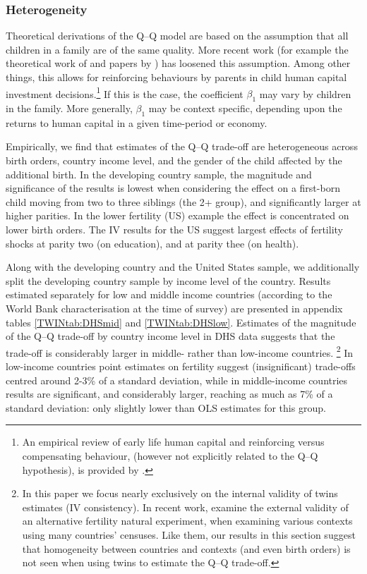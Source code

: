 \documentclass[subeqn]{article}
\begin{document}
\begin{spacing}{1.4}
\subsubsection{Heterogeneity}
Theoretical derivations of the Q--Q model are based on the assumption that all
children in a family are of the same quality. More recent work (for example the 
theoretical work of \citet{AizerCunha2012} and papers by \citet{Brinchetal2016,
  MogstadWiswall2016}) has loosened this assumption. Among 
other things, this allows for reinforcing behaviours by parents in child human 
capital investment decisions.\footnote{An empirical review of early life human 
capital and reinforcing versus compensating behaviour, (however not explicitly 
related to the Q--Q hypothesis), is provided by \citet{AlmondMazumder2013}.} If 
this is the case, the coefficient $\beta_1$ may vary by children in the family. 
More generally, $\beta_1$ may be context specific, depending upon the returns to 
human capital in a given time-period or economy.

Empirically, we find that estimates of the Q--Q trade-off are heterogeneous 
across birth orders, country income level, and the gender of the child affected 
by the additional birth. In the developing country sample, the magnitude and
significance of the results is lowest when considering the effect on a first-born
child moving from two to three siblings (the 2+ group), and significantly larger
at higher parities.  In the lower fertility (US) example the effect is
concentrated on lower birth orders. The IV results for the US suggest largest
effects of fertility shocks at parity two (on education), and at parity thee
(on health).

Along with the developing country and the United States sample, we additionally
split the developing country sample by income level of the country.  Results
estimated separately for low and middle income countries (according to the
World Bank characterisation at the time of survey) are presented in appendix
tables \ref{TWINtab:DHSmid} and \ref{TWINtab:DHSlow}. Estimates of the magnitude
of the Q--Q trade-off by country income level in DHS data suggests that the
trade-off is considerably larger in middle- rather than low-income countries.%
\footnote{In this paper we focus nearly exclusively on the internal validity
  of twins estimates (IV consistency).  In recent work, \citet{Deheijaetal2015}
  examine the external validity of an alternative fertility natural experiment,
  when examining various contexts using many countries' censuses.  Like them,
  our results in this section suggest that homogeneity between countries and
  contexts (and even birth orders) is not seen when using twins to estimate the
  Q--Q trade-off.} In low-income countries point estimates on fertility suggest 
(insignificant) trade-offs centred around 2-3\% of a standard deviation, while 
in middle-income countries results are significant, and considerably larger,
reaching as much as 7\% of a standard deviation: only slightly lower than OLS 
estimates for this group.


\end{spacing}
\end{document}
